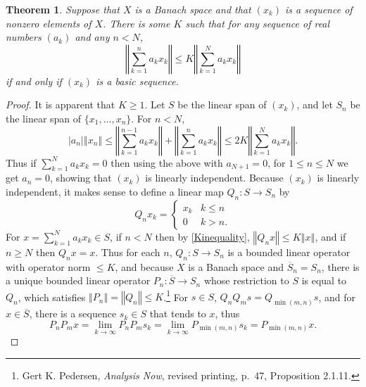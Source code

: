 \documentclass{article}
\newcommand{\norm}[1]{\left\Vert #1 \right\Vert}
\newtheorem{theorem}{Theorem}
\theoremstyle{definition}
\begin{document}
\begin{theorem}
Suppose that $X$ is a Banach space and that $(x_k)$ is a sequence of nonzero elements of $X$. 
There is some $K$ such that for any sequence of real numbers $(a_k)$ and any $n<N$,
\begin{equation}
\norm{\sum_{k=1}^n a_k x_k} \leq K \norm{\sum_{k=1}^N a_k x_k}
\label{Kinequality}
\end{equation}
if and only if $(x_k)$ is a basic sequence.
\end{theorem}
\begin{proof}
It is apparent that $K \geq 1$.
Let $S$ be the linear span of $(x_k)$, and let $S_n$ be the linear span of $\{x_1,\ldots,x_n\}$.
For $n<N$, 
\begin{equation}
|a_n| \norm{x_n} \leq
\norm{\sum_{k=1}^{n-1} a_k x_k}
+\norm{\sum_{k=1}^n a_k x_k}
\leq 2K \norm{\sum_{k=1}^N a_k x_k}.
\label{2K}
\end{equation}
Thus if $\sum_{k=1}^N a_k x_k=0$ then using the above with
$a_{N+1}=0$, for $1 \leq n \leq N$ we get $a_n=0$, showing that
$(x_k)$ is linearly independent. 
Because $(x_k)$ is linearly independent, it makes sense to define a linear map $Q_n:S \to S_n$ by
\[
Q_n x_k = \begin{cases}
x_k&k \leq n\\
0&k > n.
\end{cases}
\]
For $x=\sum_{k=1}^N a_k x_k \in S$, if $n<N$ then by \eqref{Kinequality},
$\norm{Q_n x} \leq K \norm{x}$, and if $n \geq N$ then $Q_n x = x$. Thus 
for each $n$, $Q_n:S \to S_n$ is a bounded linear operator with operator norm $\leq 
K$, and because $X$ is a Banach space and $\overline{S}_n=S_n$,
there is a unique bounded linear operator $P_n:\overline{S} \to S_n$ whose restriction to $S$ is equal
to $Q_n$, which satisfies  $\norm{P_n}=\norm{Q_n} \leq K$.\footnote{Gert K. Pedersen, {\em Analysis Now}, revised
printing, p.~47, Proposition 2.1.11.}
For $s \in S$, $Q_n Q_m  s = Q_{\min(m,n)} s$, and
for $x \in \overline{S}$, there is a sequence $s_k \in S$ 
that tends to $x$, thus
\begin{equation}
P_nP_m x = \lim_{k \to \infty} P_n P_m s_k = 
\lim_{k \to \infty} P_{\min(m,n)} s_k
=P_{\min(m,n)} x.
\label{Pmin}
\end{equation}



\end{proof}
\end{document}
